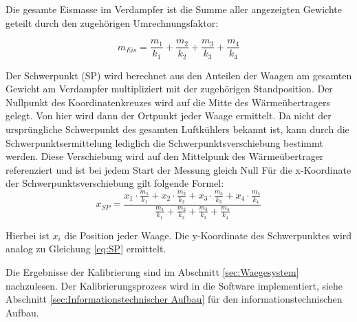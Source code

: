 Die gesamte Eismasse im Verdampfer ist die Summe aller angezeigten Gewichte geteilt durch den zugehörigen Umrechnungsfaktor:

\begin{equation}
m_{Eis}= \frac{m_1}{k_1}+ \frac{m_2}{k_2}+ \frac{m_3}{k_3}+\frac{m_4}{k_4}
\label{eq:Eismasse}
\end{equation}

Der Schwerpunkt (SP) wird berechnet aus den Anteilen der Waagen am gesamten Gewicht am Verdampfer multipliziert mit der zugehörigen Standposition. Der Nullpunkt des Koordinatenkreuzes wird auf die Mitte des Wärmeübertragers gelegt. Von hier wird dann der Ortpunkt jeder Waage ermittelt. Da nicht der ursprüngliche Schwerpunkt des gesamten Luftkühlers bekannt ist, kann durch die Schwerpunktsermittelung lediglich die Schwerpunktsverschiebung bestimmt werden. Diese Verschiebung wird auf den Mittelpunk des Wärmeübertrager referenziert und ist bei jedem Start der Messung gleich Null
Für die x-Koordinate der Schwerpunktsverschiebung gilt folgende Formel:
\begin{equation}
x_{SP} = \frac{x_1\cdot \frac{m_1}{k_1}+ x_2\cdot \frac{m_2}{k_2}+ x_3\cdot \frac{m_3}{k_3}+x_4\cdot \frac{m_4}{k_4}}{\frac{m_1}{k_1}+ \frac{m_2}{k_2}+ \frac{m_3}{k_3}+\frac{m_4}{k_4}}
\label{eq:SP}
\end{equation}

Hierbei ist $x_i$ die Position jeder Waage. Die y-Koordinate des Schwerpunktes wird analog zu Gleichung \ref{eq:SP} ermittelt. 

Die Ergebnisse der Kalibrierung sind im Abschnitt \ref{sec:Waegesystem} nachzulesen.  
Der Kalibrierungsprozess wird in die Software implementiert, siehe Abschnitt \ref{sec:Informationstechnischer Aufbau} für den informationstechnischen Aufbau. 







